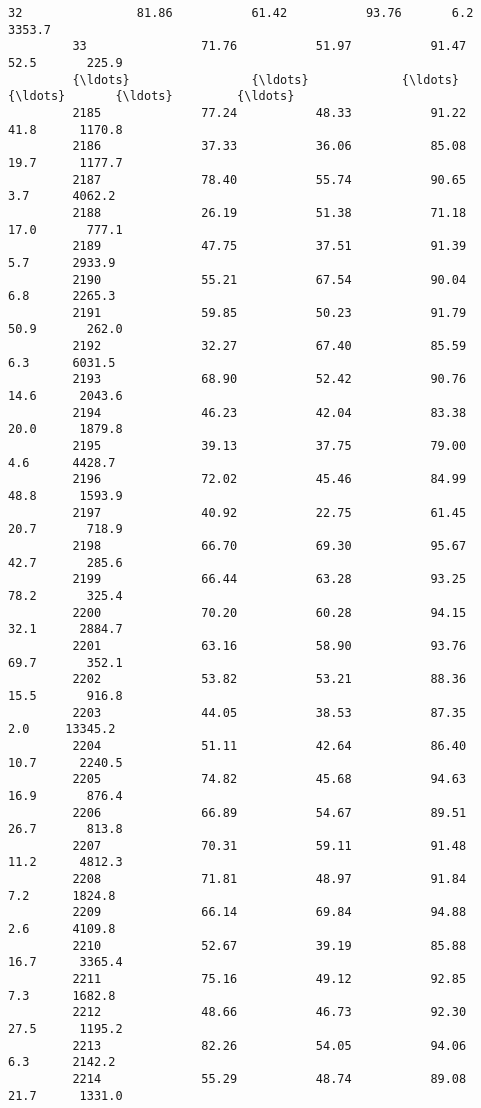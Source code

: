 \documentclass[11pt]{llncs}
\begin{document}
\begin{Verbatim}[commandchars=\\\{\}]
         32                81.86           61.42           93.76       6.2      3353.7   
         33                71.76           51.97           91.47      52.5       225.9   
         {\ldots}                 {\ldots}             {\ldots}             {\ldots}       {\ldots}         {\ldots}   
         2185              77.24           48.33           91.22      41.8      1170.8   
         2186              37.33           36.06           85.08      19.7      1177.7   
         2187              78.40           55.74           90.65       3.7      4062.2   
         2188              26.19           51.38           71.18      17.0       777.1   
         2189              47.75           37.51           91.39       5.7      2933.9   
         2190              55.21           67.54           90.04       6.8      2265.3   
         2191              59.85           50.23           91.79      50.9       262.0   
         2192              32.27           67.40           85.59       6.3      6031.5   
         2193              68.90           52.42           90.76      14.6      2043.6   
         2194              46.23           42.04           83.38      20.0      1879.8   
         2195              39.13           37.75           79.00       4.6      4428.7   
         2196              72.02           45.46           84.99      48.8      1593.9   
         2197              40.92           22.75           61.45      20.7       718.9   
         2198              66.70           69.30           95.67      42.7       285.6   
         2199              66.44           63.28           93.25      78.2       325.4   
         2200              70.20           60.28           94.15      32.1      2884.7   
         2201              63.16           58.90           93.76      69.7       352.1   
         2202              53.82           53.21           88.36      15.5       916.8   
         2203              44.05           38.53           87.35       2.0     13345.2   
         2204              51.11           42.64           86.40      10.7      2240.5   
         2205              74.82           45.68           94.63      16.9       876.4   
         2206              66.89           54.67           89.51      26.7       813.8   
         2207              70.31           59.11           91.48      11.2      4812.3   
         2208              71.81           48.97           91.84       7.2      1824.8   
         2209              66.14           69.84           94.88       2.6      4109.8   
         2210              52.67           39.19           85.88      16.7      3365.4   
         2211              75.16           49.12           92.85       7.3      1682.8   
         2212              48.66           46.73           92.30      27.5      1195.2   
         2213              82.26           54.05           94.06       6.3      2142.2   
         2214              55.29           48.74           89.08      21.7      1331.0   
         

\end{Verbatim}
\end{document}
